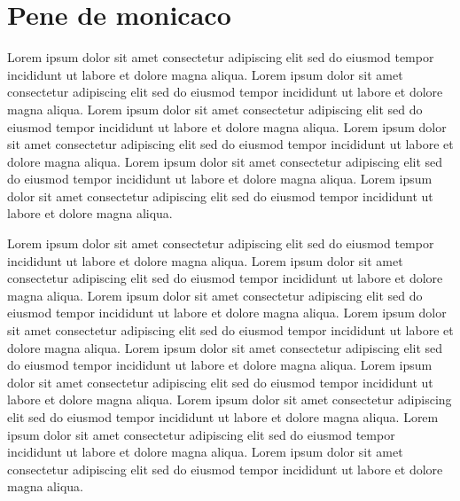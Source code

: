 \documentclass{report}
\begin{document}
\section{Pene de monicaco}
    Lorem ipsum dolor sit amet consectetur adipiscing elit sed do eiusmod tempor incididunt ut labore et dolore magna aliqua.
    Lorem ipsum dolor sit amet consectetur adipiscing elit sed do eiusmod tempor incididunt ut labore et dolore magna aliqua.
    Lorem ipsum dolor sit amet consectetur adipiscing elit sed do eiusmod tempor incididunt ut labore et dolore magna aliqua.
    Lorem ipsum dolor sit amet consectetur adipiscing elit sed do eiusmod tempor incididunt ut labore et dolore magna aliqua.
    Lorem ipsum dolor sit amet consectetur adipiscing elit sed do eiusmod tempor incididunt ut labore et dolore magna aliqua.
    Lorem ipsum dolor sit amet consectetur adipiscing elit sed do eiusmod tempor incididunt ut labore et dolore magna aliqua.

	\begin{center}
	\end{center}

    Lorem ipsum dolor sit amet consectetur adipiscing elit sed do eiusmod tempor incididunt ut labore et dolore magna aliqua.
    Lorem ipsum dolor sit amet consectetur adipiscing elit sed do eiusmod tempor incididunt ut labore et dolore magna aliqua.
    Lorem ipsum dolor sit amet consectetur adipiscing elit sed do eiusmod tempor incididunt ut labore et dolore magna aliqua.
    Lorem ipsum dolor sit amet consectetur adipiscing elit sed do eiusmod tempor incididunt ut labore et dolore magna aliqua.
    Lorem ipsum dolor sit amet consectetur adipiscing elit sed do eiusmod tempor incididunt ut labore et dolore magna aliqua.
    Lorem ipsum dolor sit amet consectetur adipiscing elit sed do eiusmod tempor incididunt ut labore et dolore magna aliqua.
    Lorem ipsum dolor sit amet consectetur adipiscing elit sed do eiusmod tempor incididunt ut labore et dolore magna aliqua.
    Lorem ipsum dolor sit amet consectetur adipiscing elit sed do eiusmod tempor incididunt ut labore et dolore magna aliqua.
    Lorem ipsum dolor sit amet consectetur adipiscing elit sed do eiusmod tempor incididunt ut labore et dolore magna aliqua.
\end{document}
